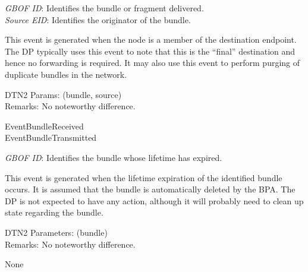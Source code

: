 %
%
%
%

{
\metP
    {\em GBOF ID}: Identifies the bundle or fragment delivered.\\
    {\em Source EID}: Identifies the originator of the bundle.

\metD
    This event is generated when the node is a member of the destination 
    endpoint. The DP typically uses this event to note that this is 
    the ``final'' destination and hence no forwarding is required. It may
    also use this event to perform purging of duplicate bundles in the network.

\metM
    DTN2 Params: (bundle, source)\\
    Remarks: No noteworthy difference.

\metR
    EventBundleReceived\\
    EventBundleTransmitted
}


{
\metP
    {\em GBOF ID}: Identifies the bundle whose lifetime has expired.

\metD
    This event is generated when the lifetime expiration of the identified
    bundle occurs. It is assumed that the bundle is automatically
    deleted by the BPA. The DP is not expected to have any action, although
    it will probably need to clean up state regarding the bundle.

\metM
    DTN2 Parameters: (bundle)\\
    Remarks: No noteworthy difference.

\metR
    None
}

